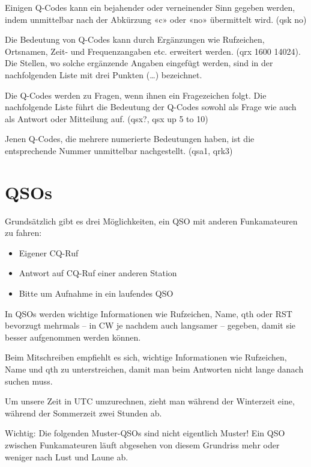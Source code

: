Einigen Q-Codes kann ein bejahender oder verneinender Sinn gegeben werden, indem unmittelbar nach der Abkürzung «c» oder «no» übermittelt wird. (qsk no)

Die Bedeutung von Q-Codes kann durch Ergänzungen wie Rufzeichen, Ortsnamen, Zeit- und Frequenzangaben etc. erweitert werden. (qrx 1600 14024). Die Stellen, wo solche ergänzende Angaben eingefügt werden, sind in der nachfolgenden Liste mit drei Punkten (…) bezeichnet. 

Die Q-Codes werden zu Fragen, wenn ihnen ein Fragezeichen folgt. Die nachfolgende Liste führt die Bedeutung der Q-Codes sowohl als Frage wie auch als Antwort oder Mitteilung auf. (qsx?, qsx up 5 to 10)

Jenen Q-Codes, die mehrere numerierte Bedeutungen haben, ist die entsprechende Nummer unmittelbar nachgestellt. (qsa1, qrk3)


\section{QSOs}
Grundsätzlich gibt es drei Möglichkeiten, ein QSO mit anderen Funkamateuren zu fahren:
\begin{itemize}
 \item Eigener CQ-Ruf
 \item Antwort auf CQ-Ruf einer anderen Station
 \item Bitte um Aufnahme in ein laufendes QSO
\end{itemize}
In QSOs werden wichtige Informationen wie Rufzeichen, Name, qth oder RST bevorzugt mehrmals – in CW je nachdem auch langsamer – gegeben, damit sie besser aufgenommen werden können.

Beim Mitschreiben empfiehlt es sich, wichtige Informationen wie Rufzeichen, Name und qth zu unterstreichen, damit man beim Antworten nicht lange danach suchen muss.

Um unsere Zeit in UTC umzurechnen, zieht man während der Winterzeit eine, während der Sommerzeit zwei Stunden ab.

Wichtig: Die folgenden Muster-QSOs sind nicht eigentlich Muster! Ein QSO zwischen Funk­amateuren läuft abgesehen von diesem Grundriss mehr oder weniger nach Lust und Laune ab.

